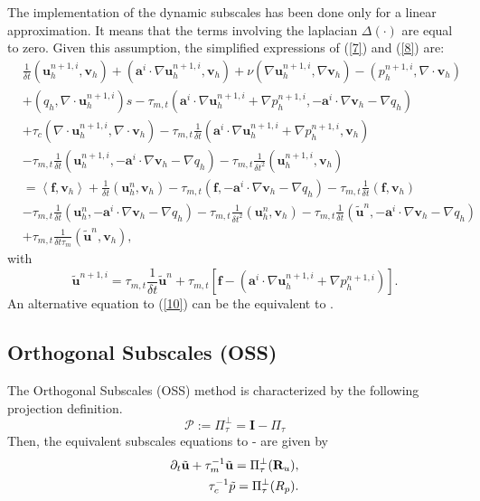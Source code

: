 The implementation of the dynamic subscales has been done only for a linear approximation. It means that the terms involving the laplacian $ \Delta(\cdot) $ are equal to zero. Given this assumption, the simplified expressions of (\ref{7}) and (\ref{8}) are:
\begin{align}
\label{9}
&\frac{1}{\delta t}(\mathbf{u}_h^{n+1,i},\mathbf{v}_h)+(\mathbf{a}^i\cdot\nabla\mathbf{u}_h^{n+1,i},\mathbf{v}_h)+\nu(\nabla\mathbf{u}_h^{n+1,i},\nabla\mathbf{v}_h)-(p_h^{n+1,i},\nabla\cdot\mathbf{v}_h)\\\nonumber
&+(q_h,\nabla\cdot\mathbf{u}_h^{n+1,i})s-\tau_{m,t}(\mathbf{a}^i\cdot\nabla\mathbf{u}_h^{n+1,i}+\nabla p_h^{n+1,i},-\mathbf{a}^i\cdot\nabla\mathbf{v}_h-\nabla q_h)\\\nonumber
&+\tau_c(\nabla\cdot\mathbf{u}_h^{n+1,i},\nabla\cdot\mathbf{v}_h)-\tau_{m,t}\frac{1}{\delta t}(\mathbf{a}^i\cdot\nabla\mathbf{u}_h^{n+1,i}+\nabla p_h^{n+1,i},\mathbf{v}_h)\\\nonumber
&-\tau_{m,t}\frac{1}{\delta t}(\mathbf{u}_h^{n+1,i},-\mathbf{a}^i\cdot\nabla\mathbf{v}_h-\nabla q_h)-\tau_{m,t}\frac{1}{\delta t^2}(\mathbf{u}_h^{n+1,i},\mathbf{v}_h)\\\nonumber
&=\left<\mathbf{f},\mathbf{v}_h\right>+\frac{1}{\delta t}(\mathbf{u}_h^n,\mathbf{v}_h)-\tau_{m,t}(\mathbf{f},-\mathbf{a}^i\cdot\nabla\mathbf{v}_h-\nabla q_h)-\tau_{m,t}\frac{1}{\delta t}(\mathbf{f},\mathbf{v}_h)\\\nonumber
&-\tau_{m,t}\frac{1}{\delta t}(\mathbf{u}_h^n,-\mathbf{a}^i\cdot\nabla\mathbf{v}_h-\nabla q_h)-\tau_{m,t}\frac{1}{\delta t^2}(\mathbf{u}_h^n,\mathbf{v}_h)-\tau_{m,t}\frac{1}{\delta t}(\tilde{\mathbf{u}}^n,-\mathbf{a}^i\cdot\nabla\mathbf{v}_h-\nabla q_h)\\\nonumber
&+\tau_{m,t}\frac{1}{\delta t\tau_m}(\tilde{\mathbf{u}}^n,\mathbf{v}_h),
\end{align}
with
\begin{equation}
\label{10}
\tilde{\mathbf{u}}^{n+1,i}=\tau_{m,t}\frac{1}{\delta t}\tilde{\mathbf{u}}^n+\tau_{m,t}\left[\mathbf{f}-(\mathbf{a}^i\cdot\nabla\mathbf{u}_h^{n+1,i}+\nabla p_h^{n+1,i})\right].
\end{equation}
An alternative equation to (\ref{10}) can be the equivalent to .

\subsection*{Orthogonal Subscales (OSS)}
The Orthogonal Subscales (OSS) method is characterized by the following projection definition.
\begin{equation}
\label{11}
\mathcal{P}:=\Pi_\tau^\bot=\mathbf{I}-\Pi_\tau
\end{equation}
Then, the equivalent subscales equations to - are given by
\begin{align}
\label{eq-A2_velo_oss}
\partial_t\tilde{{\bf u}}+\tau_m^{-1}\tilde{{\bf u}}=\Pi_\tau^\bot({\bf R}_u),\\
\label{eq-A2_press_oss}
\tau_c^{-1}\tilde{p}=\Pi_\tau^\bot(R_p).
\end{align}

